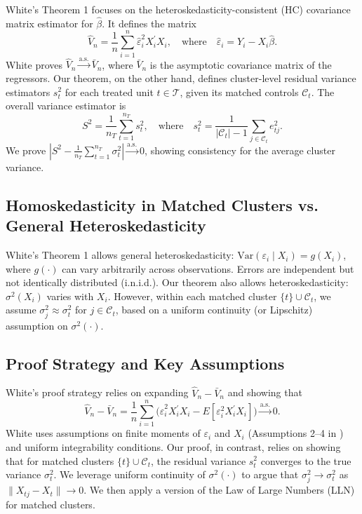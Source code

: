 \documentclass{mytemplate}
\begin{document}
White's Theorem 1 focuses on the heteroskedasticity-consistent (HC) covariance matrix estimator for \(\hat{\beta}\). It defines the matrix
\[
\hat{V}_n = \frac{1}{n} \sum_{i=1}^n \hat\varepsilon_i^2 X_i^\prime X_i,
\quad \text{where} \quad \hat\varepsilon_i = Y_i - X_i \hat{\beta}.
\]
White proves \(\hat{V}_n \xrightarrow{\text{a.s.}} \bar{V}_n\), where \(\bar{V}_n\) is the asymptotic covariance matrix of the regressors. Our theorem, on the other hand, defines cluster-level residual variance estimators \(s_t^2\) for each treated unit \(t \in \mathcal{T}\), given its matched controls \(\mathcal{C}_t\). The overall variance estimator is
\[
S^2 = \frac{1}{n_T} \sum_{t=1}^{n_T} s_t^2,
\quad \text{where} \quad
s_t^2 = \frac{1}{|\mathcal{C}_t| - 1} \sum_{j \in \mathcal{C}_t} e_{tj}^2.
\]
We prove \(|S^2 - \frac{1}{n_T}\sum_{t=1}^{n_T}\sigma_t^2| \xrightarrow{\text{a.s.}} 0\), showing consistency for the average cluster variance.

\subsection{Homoskedasticity in Matched Clusters vs. General Heteroskedasticity}

White's Theorem 1 allows general heteroskedasticity: \(\mathrm{Var}(\varepsilon_i \mid X_i) = g(X_i)\), where \(g(\cdot)\) can vary arbitrarily across observations. Errors are independent but not identically distributed (i.n.i.d.). Our theorem also allows heteroskedasticity: \(\sigma^2(X_i)\) varies with \(X_i\). However, within each matched cluster \(\{t\} \cup \mathcal{C}_t\), we assume \(\sigma_j^2 \approx \sigma_t^2\) for \(j \in \mathcal{C}_t\), based on a uniform continuity (or Lipschitz) assumption on \(\sigma^2(\cdot)\).

\subsection{Proof Strategy and Key Assumptions}

White's proof strategy relies on expanding \(\hat{V}_n - \bar{V}_n\) and showing that
\[
\hat{V}_n - \bar{V}_n = \frac{1}{n}\sum_{i=1}^n \bigl(\hat\varepsilon_i^2 X_i^\prime X_i - E[\varepsilon_i^2 X_i^\prime X_i]\bigr) \xrightarrow{\text{a.s.}} 0.
\]
White uses assumptions on finite moments of \(\varepsilon_i\) and \(X_i\) (Assumptions 2–4 in \cite{white1980heteroskedasticity}) and uniform integrability conditions. Our proof, in contrast, relies on showing that for matched clusters \(\{t\} \cup \mathcal{C}_t\), the residual variance \(s_t^2\) converges to the true variance \(\sigma_t^2\). We leverage uniform continuity of \(\sigma^2(\cdot)\) to argue that \(\sigma_j^2 \to \sigma_t^2\) as \(\|X_{tj} - X_t\| \to 0\). We then apply a version of the Law of Large Numbers (LLN) for matched clusters.
\end{document}
